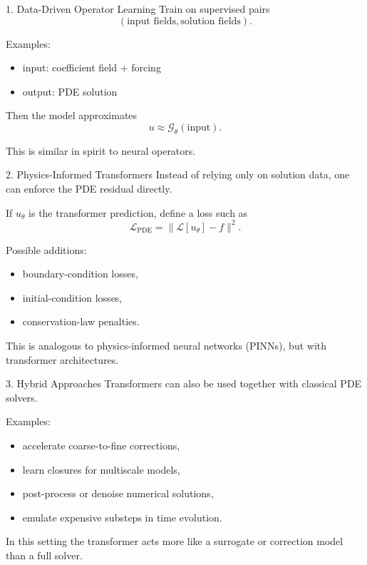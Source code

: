 \documentclass{beamer}
\begin{document}
\begin{frame}{1. Data-Driven Operator Learning}
Train on supervised pairs
\[
(\text{input fields}, \text{solution fields}).
\]

Examples:
\begin{itemize}
\item input: coefficient field + forcing
\item output: PDE solution
\end{itemize}

Then the model approximates
\[
u \approx \mathcal{G}_\theta(\text{input}).
\]

This is similar in spirit to neural operators.
\end{frame}


\begin{frame}{2. Physics-Informed Transformers}
Instead of relying only on solution data, one can enforce the PDE residual directly.

\medskip

If \(u_\theta\) is the transformer prediction, define a loss such as
\[
\mathcal{L}_{\mathrm{PDE}} =
\| \mathcal{L}[u_\theta] - f \|^2.
\]

Possible additions:
\begin{itemize}
\item boundary-condition losses,
\item initial-condition losses,
\item conservation-law penalties.
\end{itemize}

This is analogous to physics-informed neural networks (PINNs), but with transformer architectures.
\end{frame}


\begin{frame}{3. Hybrid Approaches}
Transformers can also be used together with classical PDE solvers.

Examples:
\begin{itemize}
\item accelerate coarse-to-fine corrections,
\item learn closures for multiscale models,
\item post-process or denoise numerical solutions,
\item emulate expensive substeps in time evolution.
\end{itemize}

In this setting the transformer acts more like a surrogate or correction model than a full solver.
\end{frame}
\end{document}
